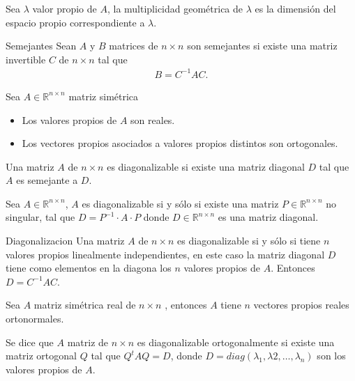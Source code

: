 \begin{Def}
Sea $\lambda$ valor propio de $A$, la multiplicidad geom\'etrica de $\lambda$ es la dimensi\'on del espacio propio correspondiente a $\lambda$.
\end{Def}

\begin{Def}Semejantes
Sean $A$ y $B$ matrices de $n\times n$ son semejantes si existe una matriz invertible $C$ de $n\times n$ tal que
\begin{eqnarray}
B=C^{-1}AC.
\end{eqnarray}
\end{Def}


\begin{Teo}
Sea $A\in\mathbb{R}^{n\times n}$ matriz sim\'etrica
\begin{itemize}
\item[i) ] Los valores propios de $A$ son reales.
\item[ii) ] Los vectores propios asociados a valores propios distintos son ortogonales.
\end{itemize}

\end{Teo}

\begin{Def}[Diagonalizacion]
Una matriz $A$ de $n\times n$ es diagonalizable si existe una matriz diagonal $D$ tal que $A$ es semejante a $D$.
\end{Def}


\begin{Prop}
Sea $A\in\mathbb{R}^{n\times n}$, $A$ es diagonalizable si y s\'olo si existe una matriz $P\in\mathbb{R}^{n\times n}$ no singular, tal que $D=P^{-1}\cdot A \cdot P$ donde $D\in\mathbb{R}^{n\times n}$ es una matriz diagonal.


\end{Prop}

\begin{Teo}Diagonalizacion
Una matriz $A$ de $n\times n$ es diagonalizable si y s\'olo si tiene $n$ valores propios linealmente independientes, en este caso la matriz diagonal $D$ tiene como elementos en la diagona los $n$ valores propios de $A$. Entonces $D=C^{-1}AC$.
\end{Teo}

\begin{Teo}
Sea $A$ matriz sim\'etrica real de $n\times n$ , entonces $A$ tiene $n$ vectores propios reales ortonormales.
\end{Teo}

\begin{Def}
Se dice que $A$ matriz de $n\times n$ es diagonalizable ortogonalmente si existe una matriz ortogonal $Q$ tal que $Q^{t}AQ=D$, donde $D=diag\left(\lambda_{1},\lambda{2},\dots,\lambda_{n}\right)$ son los valores propios de $A$.
\end{Def}

